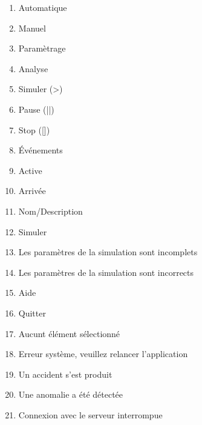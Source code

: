 \begin{enumerate}
	\item Automatique
	\item Manuel
	\item Paramètrage
	\item Analyse
	\item Simuler (>)
	\item Pause (||)
	\item Stop ([])
	\item Événements
	\item Active
	\item Arrivée
	\item Nom/Description
	\item Simuler
	\item Les paramètres de la simulation sont incomplets
	\item Les paramètres de la simulation sont incorrects
	\item Aide
	\item Quitter
	\item Aucunt élément sélectionné
	\item Erreur système, veuillez relancer l'application
	\item Un accident s'est produit
	\item Une anomalie a été détectée
	\item Connexion avec le serveur interrompue
\end{enumerate}

